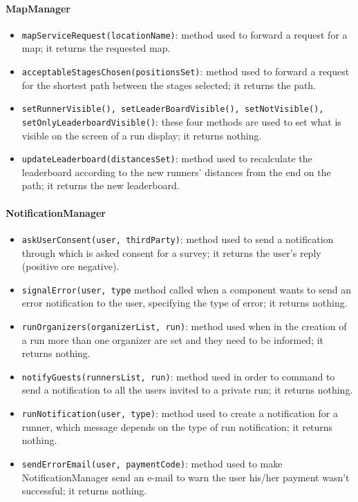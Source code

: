 \paragraph{MapManager}

\begin{itemize}
\item[ ]\texttt{mapServiceRequest(locationName)}: method used to forward a request for a map; it returns the requested map.

\item[ ]\texttt{acceptableStagesChosen(positionsSet)}: method used to forward a request for the shortest path between the stages selected; it returns the path.

\item[ ]\texttt{setRunnerVisible(), setLeaderBoardVisible(), setNotVisible(), setOnlyLeaderb\-oardVisible()}: these four methods are used to set what is visible on the screen of a run display; it returns nothing.

\item[ ]\texttt{updateLeaderboard(distancesSet)}: method used to recalculate the leaderboard according to the new runners' distances from the end on the path; it returns the new leaderboard.
\end{itemize}
 
\paragraph{NotificationManager}

\begin{itemize}
\item[ ]\texttt{askUserConsent(user, thirdParty)}: method used to send a notification through which is asked consent for a survey; it returns the user's reply (positive ore negative).

\item[ ]\texttt{signalError(user, type} method called when a component wants to send an error notification to the user, specifying the type of error; it returns nothing.

\item[ ]\texttt{runOrganizers(organizerList, run)}: method used when in the creation of a run more than one organizer are set and they need to be informed; it returns nothing.

\item[ ]\texttt{notifyGuests(runnersList, run)}: method used in order to command to send a notification to all the users invited to a private run; it returns nothing.

\item[ ]\texttt{runNotification(user, type)}: method used to create a notification for a runner, which message depends on the type of run notification; it returns nothing.

\item[ ]\texttt{sendErrorEmail(user, paymentCode)}: method used to make NotificationManager send an e-mail to warn the user his/her payment wasn't successful; it returns nothing.
\end{itemize}

